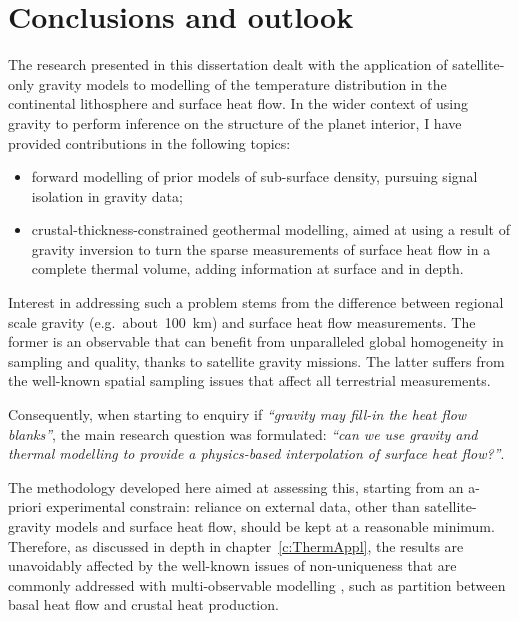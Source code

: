 \chapter{Conclusions and outlook}
\label{c:Conclusions}

The research presented in this dissertation dealt with the application of satellite-only gravity models to modelling of the temperature distribution in the continental lithosphere and surface heat flow.
In the wider context of using gravity to perform inference on the structure of the planet interior, I have provided contributions in the following topics:
\begin{itemize}
    \item forward modelling of prior models of sub-surface density, pursuing signal isolation in gravity data;
    \item crustal-thickness-constrained geothermal modelling, aimed at using a result of gravity inversion to turn the sparse measurements of surface heat flow in a complete thermal volume, adding information at surface and in depth.
\end{itemize}

Interest in addressing such a problem stems from the difference between regional scale gravity (e.g.~about~\SI{100}{\kilo \metre}) and surface heat flow measurements.
The former is an observable that can benefit from unparalleled global homogeneity in sampling and quality, thanks to satellite gravity missions.
The latter suffers from the well-known spatial sampling issues that affect all terrestrial measurements.

Consequently, when starting to enquiry if \emph{``gravity may fill-in the heat flow blanks''}, the main research question was formulated: \emph{``can we use gravity and thermal modelling to provide a physics-based interpolation of surface heat flow?''}.

The methodology developed here aimed at assessing this, starting from an a-priori experimental constrain: reliance on external data, other than satellite-gravity models and surface heat flow, should be kept at a reasonable minimum.
Therefore, as discussed in depth in chapter~\ref{c:ThermAppl}, the results are unavoidably affected by the well-known issues of non-uniqueness that are commonly addressed with multi-observable modelling \parencite{Afonso2013multiobsI}, such as partition between basal heat flow and crustal heat production.

